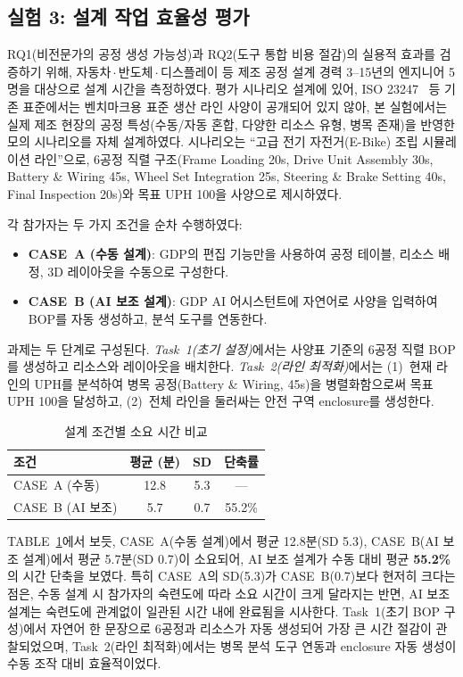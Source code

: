 \documentclass[conference]{IEEEtran}
\begin{document}
\subsection{실험 3: 설계 작업 효율성 평가}

RQ1(비전문가의 공정 생성 가능성)과 RQ2(도구 통합 비용 절감)의 실용적 효과를 검증하기 위해, 자동차\,$\cdot$\,반도체\,$\cdot$\,디스플레이 등 제조 공정 설계 경력 3--15년의 엔지니어 5명을 대상으로 설계 시간을 측정하였다. 평가 시나리오 설계에 있어, ISO 23247~\cite{b3} 등 기존 표준에서는 벤치마크용 표준 생산 라인 사양이 공개되어 있지 않아, 본 실험에서는 실제 제조 현장의 공정 특성(수동/자동 혼합, 다양한 리소스 유형, 병목 존재)을 반영한 모의 시나리오를 자체 설계하였다. 시나리오는 ``고급 전기 자전거(E-Bike) 조립 시뮬레이션 라인''으로, 6공정 직렬 구조(Frame Loading 20s, Drive Unit Assembly 30s, Battery \& Wiring 45s, Wheel Set Integration 25s, Steering \& Brake Setting 40s, Final Inspection 20s)와 목표 UPH 100을 사양으로 제시하였다.

각 참가자는 두 가지 조건을 순차 수행하였다:
\begin{itemize}
\item \textbf{CASE~A (수동 설계)}: GDP의 편집 기능만을 사용하여 공정 테이블, 리소스 배정, 3D 레이아웃을 수동으로 구성한다.
\item \textbf{CASE~B (AI 보조 설계)}: GDP AI 어시스턴트에 자연어로 사양을 입력하여 BOP를 자동 생성하고, 분석 도구를 연동한다.
\end{itemize}

과제는 두 단계로 구성된다. \textit{Task~1(초기 설정)}에서는 사양표 기준의 6공정 직렬 BOP를 생성하고 리소스와 레이아웃을 배치한다. \textit{Task~2(라인 최적화)}에서는 (1)~현재 라인의 UPH를 분석하여 병목 공정(Battery \& Wiring, 45s)을 병렬화함으로써 목표 UPH 100을 달성하고, (2)~전체 라인을 둘러싸는 안전 구역 enclosure를 생성한다.

\begin{table}[!t]
\caption{설계 조건별 소요 시간 비교}
\label{tab:design_time}
\centering
\begin{tabular}{l c c c}
\hline
\textbf{조건} & \textbf{평균 (분)} & \textbf{SD} & \textbf{단축률} \\
\hline
CASE~A (수동) & 12.8 & 5.3 & --- \\
CASE~B (AI 보조) & 5.7 & 0.7 & 55.2\% \\
\hline
\end{tabular}
\end{table}

TABLE~\ref{tab:design_time}에서 보듯, CASE~A(수동 설계)에서 평균 12.8분(SD 5.3), CASE~B(AI 보조 설계)에서 평균 5.7분(SD 0.7)이 소요되어, AI 보조 설계가 수동 대비 평균 \textbf{55.2\%}의 시간 단축을 보였다. 특히 CASE~A의 SD(5.3)가 CASE~B(0.7)보다 현저히 크다는 점은, 수동 설계 시 참가자의 숙련도에 따라 소요 시간이 크게 달라지는 반면, AI 보조 설계는 숙련도에 관계없이 일관된 시간 내에 완료됨을 시사한다. Task~1(초기 BOP 구성)에서 자연어 한 문장으로 6공정과 리소스가 자동 생성되어 가장 큰 시간 절감이 관찰되었으며, Task~2(라인 최적화)에서는 병목 분석 도구 연동과 enclosure 자동 생성이 수동 조작 대비 효율적이었다.
\end{document}
